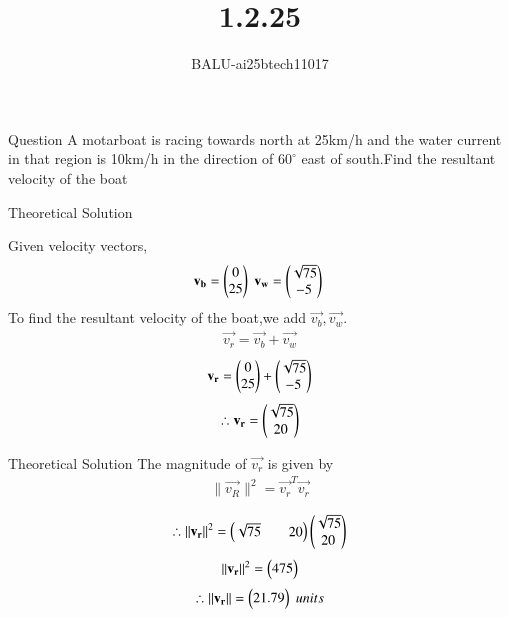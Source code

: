 \documentclass{beamer}
\title %
{1.2.25}
\author %
{BALU-ai25btech11017}
\begin{document}
\frame{\titlepage}
\begin{frame}{Question}
A motarboat is racing towards north at 25km/h and the water current in that  region is 10km/h in the direction of $60^\circ$
east of south.Find the resultant velocity of the boat\\ 
\end{frame}



\begin{frame}{Theoretical Solution}

Given velocity vectors,
\begin{align}
    \vec{v_b}=\begin{myvec}{0\\25}\end{myvec}\;
    \vec{v_w}=\begin{myvec}{\sqrt{75}\\-5}\end{myvec}\
\end{align}
To find the resultant velocity of the boat,we add $\vec{v_b} ,\vec{v_w}$.\\

\begin{align}
    \vec{v_r}=\vec{v_b}+\vec{v_w}
\end{align}
\begin{align}
    \vec{v_r}=\begin{myvec}{0\\25}\end{myvec}+\begin{myvec}{\sqrt{75}\\-5}\end{myvec}
\end{align}
\begin{align}
    \therefore\vec{v_r}=\begin{myvec}{\sqrt{75}\\20}\end{myvec}
\end{align}

\end{frame}

\begin{frame}{Theoretical Solution}
The magnitude of $\vec{v_r}$ is given by \\
\begin{align}
    \|\vec{v_R}\|^2=\vec{v_r}^T\vec{v_r}
\end{align}

\begin{align}
      \therefore\|\vec{v_r}\|^2=\begin{myvec}{\sqrt{75}&&20}\end{myvec}\begin{myvec}{\sqrt{75}\\20}
      \end{myvec}
\end{align}
\begin{align}
    \|\vec{v_r}\|^2=\myvec{475}
\end{align}
\begin{align}
    \therefore\|\vec{v_r}\|=\myvec{21.79} \;units
\end{align}
\end{frame}
\end{document}
